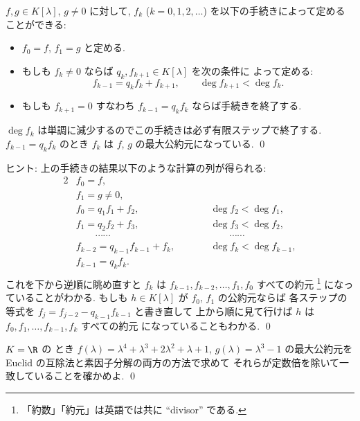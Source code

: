 \documentclass[12pt,twoside]{jarticle}
\begin{document}
\begin{question}
\label{q:Euclidean-algorithm-1}
  $f,g\in K[\lambda]$, $g\ne 0$ に対して, 
  $f_k$ ($k=0,1,2,\dots$) を以下の手続きによって定めることができる:
  \begin{itemize}
  \item $f_0=f$, $f_1=g$ と定める.
  \item もしも $f_k\ne 0$ ならば $q_k, f_{k+1}\in K[\lambda]$ を次の条件に
    よって定める:
    \begin{equation*}
      f_{k-1} = q_k f_k + f_{k+1}, \qquad \deg f_{k+1} < \deg f_k.
    \end{equation*}
  \item もしも $f_{k+1}=0$ すなわち $f_{k-1}=q_kf_k$ ならば手続きを終了する.
  \end{itemize}
  $\deg f_k$ は単調に減少するのでこの手続きは必ず有限ステップで終了する.
  $f_{k-1}=q_kf_k$ のとき $f_k$ は $f$, $g$ の最大公約元になっている.
  \qed
\end{question}

\noindent
ヒント: 上の手続きの結果以下のような計算の列が得られる:
\begin{alignat*}{2}
  & f_0 = f, & & \\
  & f_1 = g \ne 0, & & \\
  & f_0 = q_1f_1 + f_2, & \qquad & \deg f_2 < \deg f_1, \\
  & f_1 = q_2f_2 + f_3, & \qquad & \deg f_3 < \deg f_2, \\
  & \qquad \cdots\cdots & \qquad & \qquad\cdots\cdots \\
  & f_{k-2} = q_{k-1}f_{k-1} + f_k, & \qquad & \deg f_k < \deg f_{k-1}, \\
  & f_{k-1} = q_kf_k. & & \\
\end{alignat*}
これを下から逆順に眺め直すと $f_k$ は $f_{k-1},f_{k-2},\dots,f_1,f_0$ 
すべての約元%
\footnote{「約数」「約元」は英語では共に ``divisor'' である.}
になっていることがわかる.  
もしも $h\in K[\lambda]$ が $f_0$, $f_1$ の公約元ならば
各ステップの等式を $f_j = f_{j-2} - q_{k-1}f_{k-1}$ と書き直して
上から順に見て行けば $h$ は $f_0,f_1,\dots,f_{k-1},f_k$ すべての約元
になっていることもわかる.
\qed


\begin{question}
\label{q:Euclidean-algorithm-example}
  $K=\R$ の
  とき $f(\lambda)=\lambda^4+\lambda^3+2\lambda^2+\lambda+1$,
  $g(\lambda)=\lambda^3-1$ の最大公約元を 
  Euclid の互除法と素因子分解の両方の方法で求めて
  それらが定数倍を除いて一致していることを確かめよ.
  \qed
\end{question}
\end{document}
